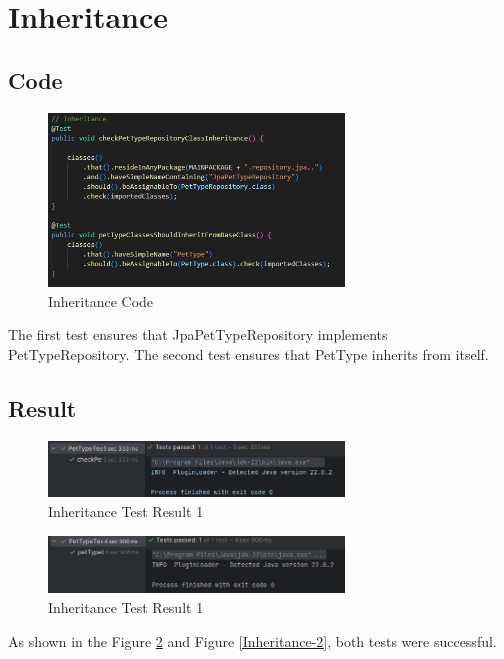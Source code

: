 \documentclass[a4paper,11pt,openright,BCOR=15mm]{scrbook}
\begin{document}
	
	
	
	
	\section{Inheritance}
	\subsection{Code}
	\begin{figure}[H]
		\centering
		\includegraphics[width=0.7\textwidth]{figs/Architectural Compliance/Inhritance Code.png}
		\caption{Inheritance Code}
		\label{fig:Inheritance-Code}
	\end{figure}
	The first test ensures that JpaPetTypeRepository implements PetTypeRepository. The second test ensures that PetType inherits from itself.
	\subsection{Result}
	\begin{figure}[H]
		\centering
		\includegraphics[width=0.7\textwidth]{figs/Architectural Compliance/Inheritance.png}
		\caption{Inheritance Test Result 1}
		\label{fig:Inheritance-1}
	\end{figure}
	\begin{figure}[H]
		\centering
		\includegraphics[width=0.7\textwidth]{figs/Architectural Compliance/Inheritance2.png}
		\caption{Inheritance Test Result 1}
		\label{fig:Inheritance-2}
	\end{figure}
	As shown in the Figure \ref{fig:Inheritance-1} and Figure \ref{Inheritance-2}, both tests were successful.
\end{document}
